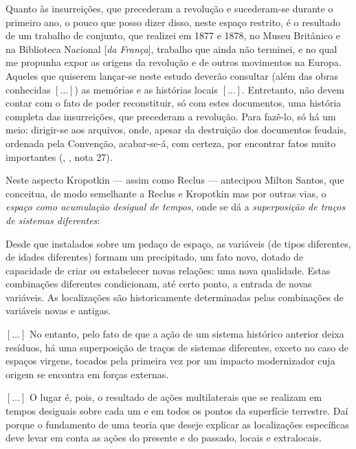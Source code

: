 \begin{citacao}
Quanto às insurreições, que precederam a revolução e sucederam-se durante o primeiro ano, o pouco que posso dizer disso, neste espaço restrito, é o resultado de um trabalho de conjunto, que realizei em 1877 e 1878, no Museu Britânico e na Biblioteca Nacional [\textit{da França}], trabalho que ainda não terminei, e no qual me propunha expor as origens da revolução e de outros movimentos na Europa. Aqueles que quiserem lançar-se neste estudo deverão consultar (além das obras conhecidas \([\dots]\)) as memórias e as histórias locais \([\dots]\). Entretanto, não devem contar com o fato de poder reconstituir, só com estes documentos, uma história completa das insurreições, que precederam a revolução. Para fazê-lo, só há um meio: dirigir-se aos arquivos, onde, apesar da destruição dos documentos feudais, ordenada pela Convenção, acabar-se-á, com certeza, por encontrar fatos muito importantes (\citeauthor{KROPOTKIN2005f}, \citeyear{KROPOTKIN2005f},  nota 27).
\end{citacao}

Neste aspecto Kropotkin --- assim como Reclus --- antecipou Milton Santos, que conceitua, de modo semelhante a Reclus e Kropotkin mas por outras vias, o \textit{espaço como acumulação desigual de tempos}, onde se dá a \textit{superposição de traços de sistemas diferentes}:

\begin{citacao}
Desde que instalados sobre um pedaço de espaço, as variáveis (de tipos diferentes, de idades diferentes) formam um precipitado, um fato novo, dotado de capacidade de criar ou estabelecer novas relações: uma nova qualidade. Estas combinações diferentes condicionam, até certo ponto, a entrada de novas variáveis. As localizações são historicamente determinadas pelas combinações de variáveis novas e antigas. 

\([\dots]\) No entanto, pelo fato de que a ação de um sistema histórico anterior deixa resíduos, há uma superposição de traços de sistemas diferentes, exceto no caso de espaços virgens, tocados pela primeira vez por um impacto modernizador cuja origem se encontra em forças externas. 

\([\dots]\) O lugar é, pois, o resultado de ações multilaterais que se realizam em tempos desiguais sobre cada um e em todos os pontos da superfície terrestre. Daí porque o fundamento de uma teoria que deseje explicar as localizações específicas deve levar em conta as ações do presente e do passado, locais e extralocais. \cite[p.~256-258]{SANTOS2008}
\end{citacao}

